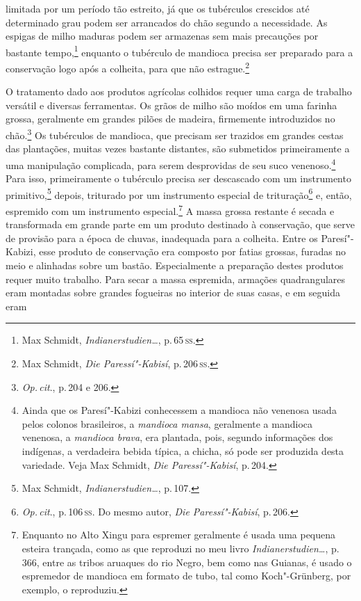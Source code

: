 limitada por um período tão estreito, já que os tubérculos crescidos até
determinado grau podem ser arrancados do chão segundo a necessidade. As
espigas de milho maduras podem ser armazenas sem mais precauções por
bastante tempo,\footnote{Max Schmidt, \textit{Indianerstudien\ldots}, p.\,65\,\textsc{ss}.} enquanto o tubérculo de mandioca
precisa ser preparado para a conservação logo após a colheita, para que
não estrague.\footnote{Max Schmidt, \textit{Die Paressí"-Kabisí}, p.\,206\,\textsc{ss}.}

O tratamento dado aos produtos agrícolas colhidos requer uma carga de
trabalho versátil e diversas ferramentas. Os grãos de milho são moídos
em uma farinha grossa, geralmente em grandes pilões de madeira,
firmemente introduzidos no chão.\footnote{\textit{Op.\,cit}., p.\,204 e 206.} Os
tubérculos de mandioca, que precisam ser trazidos em grandes cestas das
plantações, muitas vezes bastante distantes, são submetidos
primeiramente a uma manipulação complicada, para serem desprovidas de
seu suco venenoso.\footnote{Ainda que os Paresí"-Kabizi conhecessem a
  mandioca não venenosa usada pelos colonos brasileiros, a \textit{mandioca
  mansa}, geralmente a mandioca venenosa, a \textit{mandioca brava}, era
  plantada, pois, segundo informações dos indígenas, a verdadeira bebida
  típica, a chicha, só pode ser produzida desta variedade. Veja Max
  Schmidt, \textit{Die Paressí"-Kabisí}, p.\,204.} Para isso,
primeiramente o tubérculo precisa ser descascado com um instrumento
primitivo,\footnote{Max Schmidt, \textit{Indianerstudien\ldots}, p.\,107.} depois, triturado por um instrumento
especial de trituração\footnote{\textit{Op.\,cit}., p.\,106\,\textsc{ss}. Do mesmo autor,
  \textit{Die Paressí"-Kabisí}, p.\,206.} e, então, espremido com um
instrumento especial.\footnote{Enquanto no Alto Xingu para espremer
  geralmente é usada uma pequena esteira trançada, como as que reproduzi
  no meu livro \textit{Indianerstudien\ldots}, p.\,366,
  entre as tribos aruaques do rio Negro, bem como nas Guianas, é usado o
  espremedor de mandioca em formato de tubo, tal como Koch"-Grünberg, por
  exemplo, o reproduziu.} A massa grossa restante é secada e
transformada em grande parte em um produto destinado à conservação,
que serve de provisão para a época de chuvas, inadequada para a
colheita. Entre os Paresí"-Kabizi, esse produto de conservação era
composto por fatias grossas, furadas no meio e alinhadas sobre um
bastão. Especialmente a preparação destes produtos requer
muito trabalho. Para secar a massa espremida, armações quadrangulares
eram montadas sobre grandes fogueiras no interior de suas casas, e em seguida eram 
